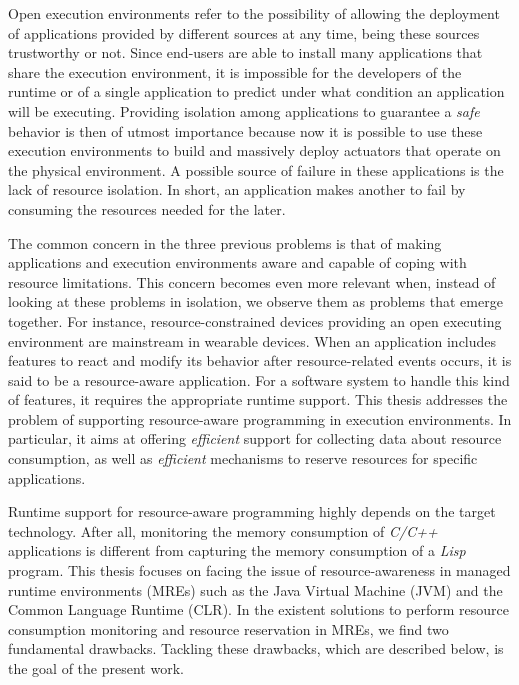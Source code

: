 Open execution environments refer to the possibility of allowing the deployment of applications provided by different sources at any time, being these sources trustworthy or not.
Since end-users are able to install many applications that share the execution environment, it is impossible for the developers of the runtime or of a single application to predict under what condition an application will be executing.
Providing isolation among applications to guarantee a \textit{safe} behavior is then of utmost importance because now it is possible to use these execution environments to build and massively deploy actuators that operate on the physical environment.
A possible source of failure in these applications is the lack of resource isolation.
In short, an application makes another to fail by consuming the resources needed for the later.

The common concern in the three previous problems is that of making applications and execution environments aware and capable of coping with resource limitations.
This concern becomes even more relevant when, instead of looking at these problems in isolation, we observe them as problems that emerge together.
For instance, resource-constrained devices providing an open executing environment are mainstream in wearable devices. 
When an application includes features to react and modify its behavior after resource-related events occurs, it is said to be a resource-aware application.
For a software system to handle this kind of features, it requires the appropriate runtime support.   
This thesis addresses the problem of supporting resource-aware programming in execution environments.
In particular, it aims at offering \textit{efficient} support for collecting data about resource consumption, as well as \textit{efficient} mechanisms to reserve resources for specific applications.

Runtime support for resource-aware programming highly depends on the target technology.
After all, monitoring the memory consumption of \textit{C/C++} applications is different from capturing the memory consumption of a \textit{Lisp} program.
This thesis focuses on facing the issue of resource-awareness in managed runtime environments (MREs) such as the Java Virtual Machine (JVM) and the Common Language Runtime (CLR).
In the existent solutions to perform resource consumption monitoring and resource reservation in MREs, we find two fundamental drawbacks.
Tackling these drawbacks, which are described below, is the goal of the present work.

